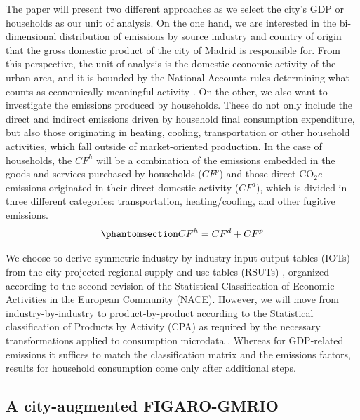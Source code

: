 \documentclass[
  10pt,
  twocolumn]{aft}
\begin{document}
The paper will present two different approaches as we select the city's
GDP or households as our unit of analysis. On the one hand, we are
interested in the bi-dimensional distribution of emissions by source
industry and country of origin that the gross domestic product of the
city of Madrid is responsible for. From this perspective, the unit of
analysis is the domestic economic activity of the urban area, and it is
bounded by the National Accounts rules determining what counts as
economically meaningful activity
\citep{lequiller_understanding_2014, eurostat_european_2013}. On the
other, we also want to investigate the emissions produced by households.
These do not only include the direct and indirect emissions driven by
household final consumption expenditure, but also those originating in
heating, cooling, transportation or other household activities, which
fall outside of market-oriented production. In the case of households,
the \(CF^h\) will be a combination of the emissions embedded in the
goods and services purchased by households (\(CF^p\)) and those direct
\(\text{CO}_2e\) emissions originated in their direct domestic activity
(\(CF^d\)), which is divided in three different categories:
transportation, heating/cooling, and other fugitive emissions.
\begin{equation}\phantomsection\label{eq-carbon-footprint-households}{
CF^h =  CF^d + CF^p
}\end{equation}

We choose to derive symmetric industry-by-industry input-output tables
(IOTs) from the city-projected regional supply and use tables (RSUTs)
\citep{remond-tiedrez_eu_2019}, organized according to the second
revision of the Statistical Classification of Economic Activities in the
European Community (NACE). However, we will move from
industry-by-industry to product-by-product according to the Statistical
classification of Products by Activity (CPA) as required by the
necessary transformations applied to consumption microdata
\citep{miller_input-output_2022, cazcarro_linking_2022}. Whereas for
GDP-related emissions it suffices to match the classification matrix and
the emissions factors, results for household consumption come only after
additional steps.

\subsection{A city-augmented FIGARO-GMRIO}\label{sec-method-city}
\end{document}
